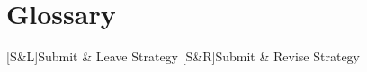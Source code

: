 \newcommand\thesistypedebug{}
\newcommand\thesistitle{Masterthesis}
\newcommand\thesisdate{July 31, 2017}




\let\chapter\section 
\let\section\subsection 
\let\subsection\subsubsection 


	\frontmatter	
		\pagestyle{empty}	
			 
			
			
			
			 
		
	\mainmatter
		\pagestyle{scrheadings}
			


	\appendix
	\pagestyle{scrheadings}
			
			\clearpage
				 
	\backmatter
		\pagestyle{empty}
			\chapter{Glossary}
				\begin{acronym}
					[S\&L]{Submit \& Leave Strategy}
					[S\&R]{Submit \& Revise Strategy}	
				\end{acronym}
			
			
			
